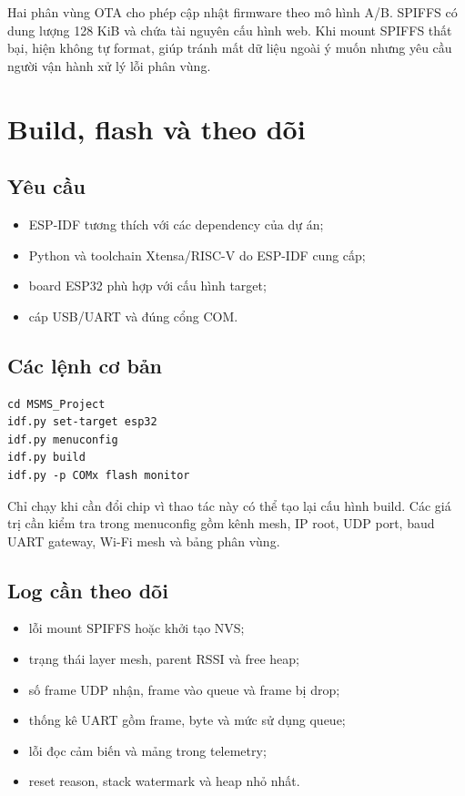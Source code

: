 \documentclass[a4paper]{article}
\newcommand{\codeword}[1]{\texttt{\detokenize{#1}}}
\begin{document}
Hai phân vùng OTA cho phép cập nhật firmware theo mô hình A/B. SPIFFS có dung
lượng 128 KiB và chứa tài nguyên cấu hình web. Khi mount SPIFFS thất bại,
\codeword{init_spiffs()} hiện không tự format, giúp tránh mất dữ liệu ngoài ý
muốn nhưng yêu cầu người vận hành xử lý lỗi phân vùng.

\section{Build, flash và theo dõi}

\subsection{Yêu cầu}

\begin{itemize}
  \item ESP-IDF tương thích với các dependency của dự án;
  \item Python và toolchain Xtensa/RISC-V do ESP-IDF cung cấp;
  \item board ESP32 phù hợp với cấu hình target;
  \item cáp USB/UART và đúng cổng COM.
\end{itemize}

\subsection{Các lệnh cơ bản}

\begin{lstlisting}[style=textstyle,caption={Build và nạp firmware}]
cd MSMS_Project
idf.py set-target esp32
idf.py menuconfig
idf.py build
idf.py -p COMx flash monitor
\end{lstlisting}

Chỉ chạy \codeword{set-target} khi cần đổi chip vì thao tác này có thể tạo lại
cấu hình build. Các giá trị cần kiểm tra trong menuconfig gồm kênh mesh, IP
root, UDP port, baud UART gateway, Wi-Fi mesh và bảng phân vùng.

\subsection{Log cần theo dõi}

\begin{itemize}
  \item lỗi mount SPIFFS hoặc khởi tạo NVS;
  \item trạng thái layer mesh, parent RSSI và free heap;
  \item số frame UDP nhận, frame vào queue và frame bị drop;
  \item thống kê UART gồm frame, byte và mức sử dụng queue;
  \item lỗi đọc cảm biến và mảng \codeword{err} trong telemetry;
  \item reset reason, stack watermark và heap nhỏ nhất.
\end{itemize}
\end{document}
